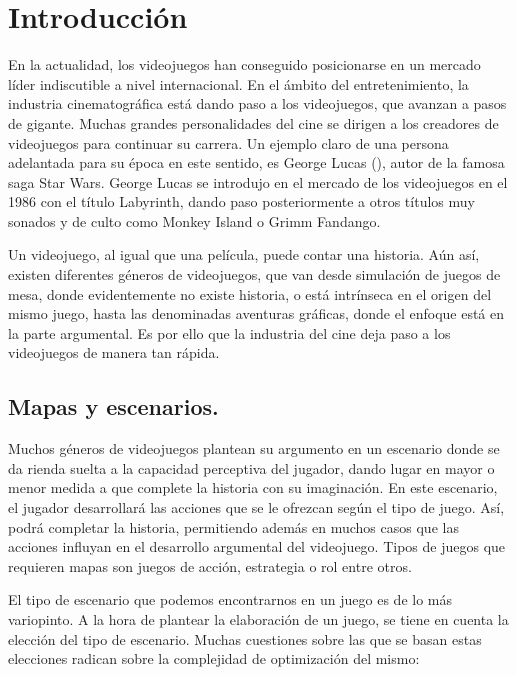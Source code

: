 \chapter*{Introducción}
\label{intro:intro}

En la actualidad, los videojuegos han conseguido posicionarse en un mercado líder indiscutible a nivel internacional. En el ámbito del entretenimiento, la industria cinematográfica está dando paso a los videojuegos, que avanzan a pasos de gigante. Muchas grandes personalidades del cine se dirigen a los creadores de videojuegos para continuar su carrera. Un ejemplo claro de una persona adelantada para su época en este sentido, es George Lucas (\cite{lucasarts}), autor de la famosa saga Star Wars. George Lucas se introdujo en el mercado de los videojuegos en el 1986 con el título Labyrinth, dando paso posteriormente a otros títulos muy sonados y de culto como Monkey Island o Grimm Fandango.

Un videojuego, al igual que una película, puede contar una historia. Aún así, existen diferentes géneros de videojuegos, que van desde simulación de juegos de mesa, donde evidentemente no existe historia, o está intrínseca en el origen del mismo juego, hasta las denominadas aventuras gráficas, donde el enfoque está en la parte argumental. Es por ello que la industria del cine deja paso a los videojuegos de manera tan rápida.

\section*{Mapas y escenarios.}

Muchos géneros de videojuegos plantean su argumento en un escenario donde se da rienda suelta a la capacidad perceptiva del jugador, dando lugar en mayor o menor medida a que complete la historia con su imaginación. En este escenario, el jugador desarrollará las acciones que se le ofrezcan según el tipo de juego. Así, podrá completar la historia, permitiendo además en muchos casos que las acciones influyan en el desarrollo argumental del videojuego. Tipos de juegos que requieren mapas son juegos de acción, estrategia o rol entre otros.

El tipo de escenario que podemos encontrarnos en un juego es de lo más variopinto. A la hora de plantear la elaboración de un juego, se tiene en cuenta la elección del tipo de escenario. Muchas cuestiones sobre las que se basan estas elecciones radican sobre la complejidad de optimización del mismo:

